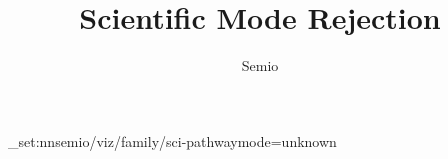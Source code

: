 \documentclass[type=paper,language=de,theme=dark]{semio}
\title{Scientific Mode Rejection}
\author{Semio}
\date{}
\begin{document}
\SemioVizProbePage
\ExplSyntaxOn\keys_set:nn{semio/viz/family/sci-pathway}{mode=unknown}\ExplSyntaxOff
{}
\SemioVizProbeEnd
\end{document}
